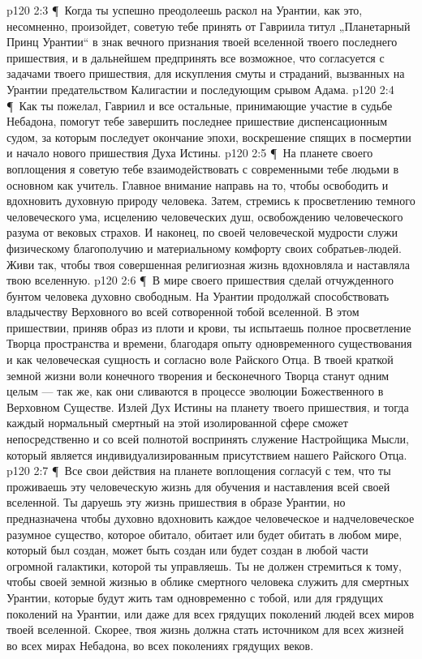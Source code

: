 \vs p120 2:3 \P\ \bibnobreakspace Когда ты успешно преодолеешь раскол на Урантии, как это, несомненно, произойдет, советую тебе принять от Гавриила титул „Планетарный Принц Урантии“ в знак вечного признания твоей вселенной твоего последнего пришествия, и в дальнейшем предпринять все возможное, что согласуется с задачами твоего пришествия, для искупления смуты и страданий, вызванных на Урантии предательством Калигастии и последующим срывом Адама.
\vs p120 2:4 \P\ \bibnobreakspace Как ты пожелал, Гавриил и все остальные, принимающие участие в судьбе Небадона, помогут тебе завершить последнее пришествие диспенсационным судом, за которым последует окончание эпохи, воскрешение спящих в посмертии и начало нового пришествия Духа Истины.
\vs p120 2:5 \P\ \bibnobreakspace На планете своего воплощения я советую тебе взаимодействовать с современными тебе людьми в основном как учитель. Главное внимание направь на то, чтобы освободить и вдохновить духовную природу человека. Затем, стремись к просветлению темного человеческого ума, исцелению человеческих душ, освобождению человеческого разума от вековых страхов. И наконец, по своей человеческой мудрости служи физическому благополучию и материальному комфорту своих собратьев\hyp{}людей. Живи так, чтобы твоя совершенная религиозная жизнь вдохновляла и наставляла твою вселенную.
\vs p120 2:6 \P\ \bibnobreakspace В мире своего пришествия сделай отчужденного бунтом человека духовно свободным. На Урантии продолжай способствовать владычеству Верховного во всей сотворенной тобой вселенной. В этом пришествии, приняв образ из плоти и крови, ты испытаешь полное просветление Творца пространства и времени, благодаря опыту одновременного существования и как человеческая сущность и согласно воле Райского Отца. В твоей краткой земной жизни воли конечного творения и бесконечного Творца станут одним целым --- так же, как они сливаются в процессе эволюции Божественного в Верховном Существе. Излей Дух Истины на планету твоего пришествия, и тогда каждый нормальный смертный на этой изолированной сфере сможет непосредственно и со всей полнотой воспринять служение Настройщика Мысли, который является индивидуализированным присутствием нашего Райского Отца.
\vs p120 2:7 \P\ \bibnobreakspace Все свои действия на планете воплощения согласуй с тем, что ты проживаешь эту человеческую жизнь для обучения и наставления всей своей вселенной. Ты даруешь эту жизнь пришествия в образе  Урантии, но предназначена  чтобы духовно вдохновить каждое человеческое и надчеловеческое разумное существо, которое обитало, обитает или будет обитать в любом мире, который был создан, может быть создан или будет создан в любой части огромной галактики, которой ты управляешь. Ты не должен стремиться к тому, чтобы своей земной жизнью в облике смертного человека служить  для смертных Урантии, которые будут жить там одновременно с тобой, или для грядущих поколений на Урантии, или даже для всех грядущих поколений людей всех миров твоей вселенной. Скорее, твоя жизнь должна стать источником  для всех жизней во всех мирах Небадона, во всех поколениях грядущих веков.
